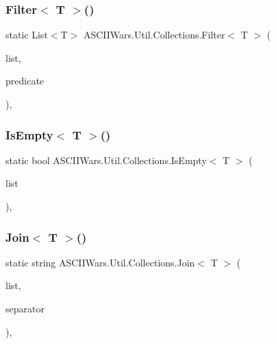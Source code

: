 \subsubsection{\texorpdfstring{Filter$<$ T $>$()}{Filter< T >()}}
{\footnotesize\ttfamily static List$<$T$>$ A\+S\+C\+I\+I\+Wars.\+Util.\+Collections.\+Filter$<$ T $>$ (\begin{DoxyParamCaption}\item[{this List$<$ T $>$}]{list,  }\item[{Func$<$ T, bool $>$}]{predicate }\end{DoxyParamCaption})\hspace{0.3cm}{\ttfamily [inline]}, {\ttfamily [static]}}

\hypertarget{class_a_s_c_i_i_wars_1_1_util_1_1_collections_af9a8a8494797736b55e88f260621af94}{}\label{class_a_s_c_i_i_wars_1_1_util_1_1_collections_af9a8a8494797736b55e88f260621af94} 
\subsubsection{\texorpdfstring{Is\+Empty$<$ T $>$()}{IsEmpty< T >()}}
{\footnotesize\ttfamily static bool A\+S\+C\+I\+I\+Wars.\+Util.\+Collections.\+Is\+Empty$<$ T $>$ (\begin{DoxyParamCaption}\item[{this I\+Enumerable$<$ T $>$}]{list }\end{DoxyParamCaption})\hspace{0.3cm}{\ttfamily [inline]}, {\ttfamily [static]}}

\hypertarget{class_a_s_c_i_i_wars_1_1_util_1_1_collections_aa6e33f9e35f12333b99d3bf601d81980}{}\label{class_a_s_c_i_i_wars_1_1_util_1_1_collections_aa6e33f9e35f12333b99d3bf601d81980} 
\subsubsection{\texorpdfstring{Join$<$ T $>$()}{Join< T >()}}
{\footnotesize\ttfamily static string A\+S\+C\+I\+I\+Wars.\+Util.\+Collections.\+Join$<$ T $>$ (\begin{DoxyParamCaption}\item[{this List$<$ T $>$}]{list,  }\item[{string}]{separator }\end{DoxyParamCaption})\hspace{0.3cm}{\ttfamily [inline]}, {\ttfamily [static]}}

